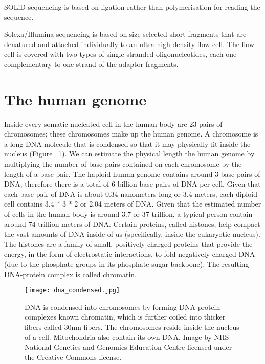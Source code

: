 SOLiD sequencing is based on ligation rather than polymerisation for reading the sequence.

Solexa/Illumina sequencing is based on size-selected short fragments that are denatured and attached individually to an ultra-high-density flow cell. The flow cell is covered with two types of single-stranded oligonucleotides, each one complementary to one strand of the adaptor fragments.

\cite{pmid19997069}

\section{The human genome}

Inside every somatic nucleated cell in the human body are 23 pairs of chromosomes; these chromosomes make up the human genome. A chromosome is a long DNA molecule that is condensed so that it may physically fit inside the nucleus (Figure ~\ref{fig:dna_condensed}). We can estimate the physical length the human genome by multiplying the number of base pairs contained on each chromosome by the length of a base pair. The haploid human genome contains around 3 base pairs of DNA; therefore there is a total of 6 billion base pairs of DNA per cell. Given that each base pair of DNA is about 0.34 nanometers long or 3.4 meters\cite{pmid7354864}, each diploid cell contains 3.4 * 3 * 2 or 2.04 meters of DNA. Given that the estimated number of cells in the human body is around 3.7 or 37 trillion\cite{pmid23829164}, a typical person contain around 74 trillion meters of DNA. Certain proteins, called histones, help compact the vast amounts of DNA inside of us (specifically, inside the eukaryotic nucleus). The histones are a family of small, positively charged proteins that provide the energy, in the form of electrostatic interactions, to fold negatively charged DNA (due to the phosphate groups in its phosphate-sugar backbone). The resulting DNA-protein complex is called chromatin.

\begin{figure}[h]
   \centering
   \texttt{[image: dna\_condensed.jpg]}
   \caption[Condensation of DNA]{DNA is condensed into chromosomes by forming DNA-protein complexes known chromatin, which is further coiled into thicker fibers called 30nm fibers. The chromosomes reside inside the nucleus of a cell. Mitochondria also contain its own DNA. Image by NHS National Genetics and Genomics Education Centre licensed under the Creative Commons license.}
   \label{fig:dna_condensed}
\end{figure}

